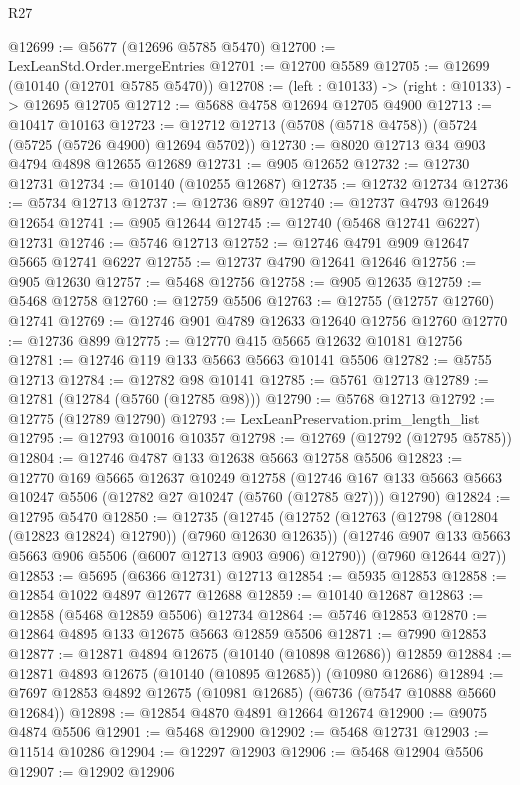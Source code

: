 \begin{lexlean}{R27}
\begin{coremodule}
@12699 := @5677 (@12696 @5785 @5470)
@12700 := LexLeanStd.Order.mergeEntries
@12701 := @12700 @5589
@12705 := @12699 (@10140 (@12701 @5785 @5470))
@12708 := (left : @10133) -> (right : @10133) -> @12695 @12705
@12712 := @5688 @4758 @12694 @12705 @4900
@12713 := @10417 @10163
@12723 := @12712 @12713 (@5708 (@5718 @4758)) (@5724 (@5725 (@5726 @4900) @12694 @5702))
@12730 := @8020 @12713 @34 @903 @4794 @4898 @12655 @12689
@12731 := @905 @12652
@12732 := @12730 @12731
@12734 := @10140 (@10255 @12687)
@12735 := @12732 @12734
@12736 := @5734 @12713
@12737 := @12736 @897
@12740 := @12737 @4793 @12649 @12654
@12741 := @905 @12644
@12745 := @12740 (@5468 @12741 @6227) @12731
@12746 := @5746 @12713
@12752 := @12746 @4791 @909 @12647 @5665 @12741 @6227
@12755 := @12737 @4790 @12641 @12646
@12756 := @905 @12630
@12757 := @5468 @12756
@12758 := @905 @12635
@12759 := @5468 @12758
@12760 := @12759 @5506
@12763 := @12755 (@12757 @12760) @12741
@12769 := @12746 @901 @4789 @12633 @12640 @12756 @12760
@12770 := @12736 @899
@12775 := @12770 @415 @5665 @12632 @10181 @12756
@12781 := @12746 @119 @133 @5663 @5663 @10141 @5506
@12782 := @5755 @12713
@12784 := @12782 @98 @10141
@12785 := @5761 @12713
@12789 := @12781 (@12784 (@5760 (@12785 @98)))
@12790 := @5768 @12713
@12792 := @12775 (@12789 @12790)
@12793 := LexLeanPreservation.prim_length_list
@12795 := @12793 @10016 @10357
@12798 := @12769 (@12792 (@12795 @5785))
@12804 := @12746 @4787 @133 @12638 @5663 @12758 @5506
@12823 := @12770
    @169
    @5665
    @12637
    @10249
    @12758
    (@12746 @167 @133 @5663 @5663 @10247 @5506 (@12782 @27 @10247 (@5760 (@12785 @27))) @12790)
@12824 := @12795 @5470
@12850 := @12735
    (@12745
      (@12752
        (@12763 (@12798 (@12804 (@12823 @12824) @12790)) (@7960 @12630 @12635))
        (@12746 @907 @133 @5663 @5663 @906 @5506 (@6007 @12713 @903 @906) @12790))
      (@7960 @12644 @27))
@12853 := @5695 (@6366 @12731) @12713
@12854 := @5935 @12853
@12858 := @12854 @1022 @4897 @12677 @12688
@12859 := @10140 @12687
@12863 := @12858 (@5468 @12859 @5506) @12734
@12864 := @5746 @12853
@12870 := @12864 @4895 @133 @12675 @5663 @12859 @5506
@12871 := @7990 @12853
@12877 := @12871 @4894 @12675 (@10140 (@10898 @12686)) @12859
@12884 := @12871 @4893 @12675 (@10140 (@10895 @12685)) (@10980 @12686)
@12894 := @7697 @12853 @4892 @12675 (@10981 @12685) (@6736 (@7547 @10888 @5660 @12684))
@12898 := @12854 @4870 @4891 @12664 @12674
@12900 := @9075 @4874 @5506
@12901 := @5468 @12900
@12902 := @5468 @12731
@12903 := @11514 @10286
@12904 := @12297 @12903
@12906 := @5468 @12904 @5506
@12907 := @12902 @12906

\end{coremodule}
\end{lexlean}
